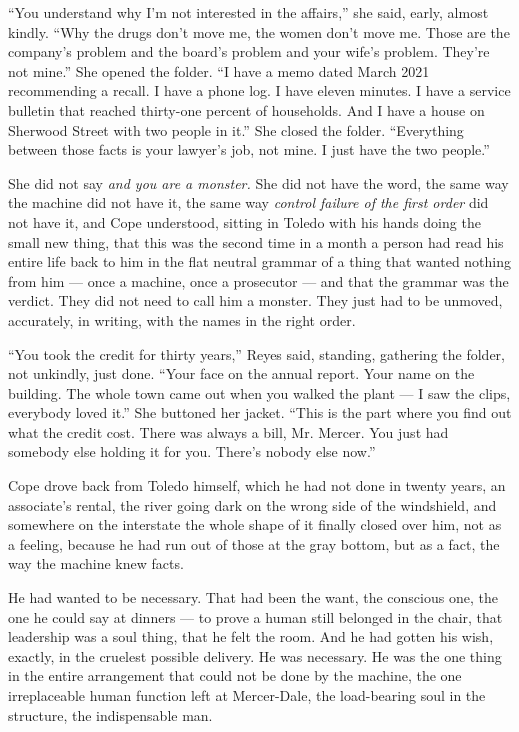 \documentclass[11pt,openany]{book}
\newcommand{\scenebreak}{\par\vspace{0.5\baselineskip}\begin{center}\textasteriskcentered\quad\textasteriskcentered\quad\textasteriskcentered\end{center}\vspace{0.5\baselineskip}\par}
\begin{document}
``You understand why I'm not interested in the affairs,'' she said, early, almost kindly. ``Why the drugs don't move me, the women don't move me. Those are the company's problem and the board's problem and your wife's problem. They're not mine.'' She opened the folder. ``I have a memo dated March 2021 recommending a recall. I have a phone log. I have eleven minutes. I have a service bulletin that reached thirty-one percent of households. And I have a house on Sherwood Street with two people in it.'' She closed the folder. ``Everything between those facts is your lawyer's job, not mine. I just have the two people.''

She did not say \textit{and you are a monster.} She did not have the word, the same way the machine did not have it, the same way \textit{control failure of the first order} did not have it, and Cope understood, sitting in Toledo with his hands doing the small new thing, that this was the second time in a month a person had read his entire life back to him in the flat neutral grammar of a thing that wanted nothing from him --- once a machine, once a prosecutor --- and that the grammar was the verdict. They did not need to call him a monster. They just had to be unmoved, accurately, in writing, with the names in the right order.

``You took the credit for thirty years,'' Reyes said, standing, gathering the folder, not unkindly, just done. ``Your face on the annual report. Your name on the building. The whole town came out when you walked the plant --- I saw the clips, everybody loved it.'' She buttoned her jacket. ``This is the part where you find out what the credit cost. There was always a bill, Mr. Mercer. You just had somebody else holding it for you. There's nobody else now.''


\scenebreak


Cope drove back from Toledo himself, which he had not done in twenty years, an associate's rental, the river going dark on the wrong side of the windshield, and somewhere on the interstate the whole shape of it finally closed over him, not as a feeling, because he had run out of those at the gray bottom, but as a fact, the way the machine knew facts.

He had wanted to be necessary. That had been the want, the conscious one, the one he could say at dinners --- to prove a human still belonged in the chair, that leadership was a soul thing, that he felt the room. And he had gotten his wish, exactly, in the cruelest possible delivery. He was necessary. He was the one thing in the entire arrangement that could not be done by the machine, the one irreplaceable human function left at Mercer-Dale, the load-bearing soul in the structure, the indispensable man.
\end{document}
